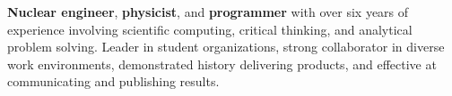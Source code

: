 

\begin{minipage}{0.68\textwidth}
\begin{justify}
	{\normalsize
	\textbf{Nuclear engineer}, \textbf{physicist}, and \textbf{programmer} with over six years of experience involving scientific computing, critical thinking, and analytical problem solving.
	Leader in student organizations, strong collaborator in diverse work environments, demonstrated history delivering products, and effective at communicating and publishing results.

	}
\end{justify}
\end{minipage}%
\hspace{4mm}
\begin{minipage}{0.28\textwidth}
\end{minipage}
